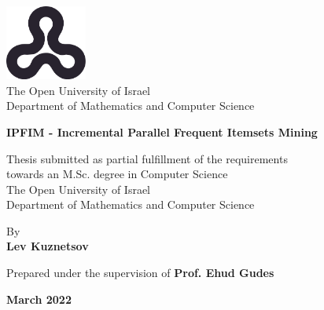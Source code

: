 \begin{titlepage}
    \begin{center}
        \vspace*{1cm}
        
        \includegraphics[width=0.2\textwidth]{ou_logo.png}\\
        The Open University of Israel\\
        Department of Mathematics and Computer Science
        
        \vspace{2cm}
        
        {\Large \textbf{IPFIM - Incremental Parallel Frequent Itemsets Mining}}
        \vspace{1.5cm}
        
        Thesis submitted as partial fulfillment of the requirements\\towards an M.Sc. degree in Computer Science\\
        The Open University of Israel\\
        Department of Mathematics and Computer Science
        
        \vspace{1cm}
        
        By \\
        \textbf{Lev Kuznetsov}
        
        \vspace{1cm}
        
        Prepared under the supervision of \textbf{Prof. Ehud Gudes}
        
        \vfill
        
        \textbf{March 2022}
    \end{center}
\end{titlepage}